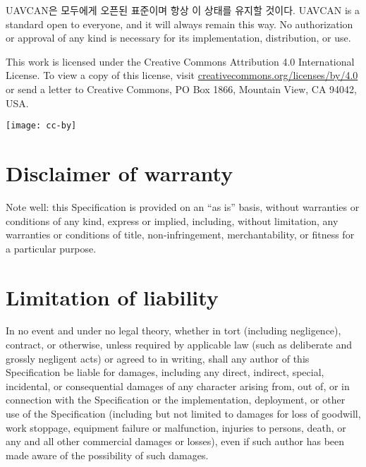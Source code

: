 \documentclass{uavcandoc}
\begin{document}
\begin{titlepage}
UAVCAN은 모두에게 오픈된 표준이며 항상 이 상태를 유지할 것이다. 
UAVCAN is a standard open to everyone, and it will always remain this way.
No authorization or approval of any kind is necessary for its implementation, distribution, or use.

This work is licensed under the Creative Commons Attribution 4.0 International License.
To view a copy of this license, visit
\href{http://creativecommons.org/licenses/by/4.0/}{creativecommons.org/licenses/by/4.0}
or send a letter to Creative Commons, PO Box 1866, Mountain View, CA 94042, USA.

\hspace*{\fill}\texttt{[image: cc-by]}\hspace*{\fill}

\section*{Disclaimer of warranty}

Note well: this Specification is provided on an ``as is'' basis, without warranties or conditions of any kind,
express or implied, including, without limitation, any warranties or conditions of
title, non-infringement, merchantability, or fitness for a particular purpose.

\section*{Limitation of liability}

In no event and under no legal theory, whether in tort (including negligence), contract, or otherwise,
unless required by applicable law (such as deliberate and grossly negligent acts) or agreed to in writing,
shall any author of this Specification be liable for damages,
including any direct, indirect, special, incidental, or consequential damages of any character arising
from, out of, or in connection with the Specification or the implementation, deployment,
or other use of the Specification (including but not limited to damages for loss of goodwill,
work stoppage, equipment failure or malfunction, injuries to persons, death,
or any and all other commercial damages or losses),
even if such author has been made aware of the possibility of such damages.

\end{titlepage}

\tableofcontents
\clearpage\onecolumn\listoftables
\clearpage\onecolumn\listoffigures

\mainmatter







\end{document}
